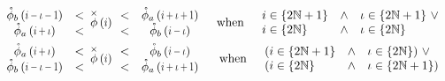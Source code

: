 \begin{align}\label{eq:extremaBounds}
\begin{array}{cc}
  \extremaTheta{b}{i-\iota-1} & < \\
  \extremaTheta{a} {i+\iota} & < 
\end{array}
&\thetaX{i}
\begin{array}{cc}
  < &  \extremaTheta{a}{i+\iota+1}  \\
  < & \extremaTheta{b}{i-\iota}  
\end{array} & \text{when} \quad 
\begin{array}{lcl}
i \in \{2 \mathbb{N}+1\}  & \land & \iota \in \{2 \mathbb{N}+1\} \  \lor \\ 
i \in \{2 \mathbb{N}     \} &  \land & \iota \in \{2 \mathbb{N}    \} \\
 \end{array}  \\
\begin{array}{cc}
  \extremaTheta{a}{i+\iota} & < \\
  \extremaTheta{b} {i-\iota-1} & < 
\end{array}
&\thetaX{i}
\begin{array}{cc}
  < & \extremaTheta{b}{i-\iota}  \\
  < & \extremaTheta{a}{i+\iota+1}  
\end{array} & 
\text{when} \quad 
\begin{array}{lcl}
 (i\in \{2 \mathbb{N}+1\} & \land & \iota \in \{2 \mathbb{N}    \}) \ \lor \\
 (i\in \{2 \mathbb{N}    \} & \land & \iota \in \{2 \mathbb{N}+1\})
 \end{array} 
\end{align}

